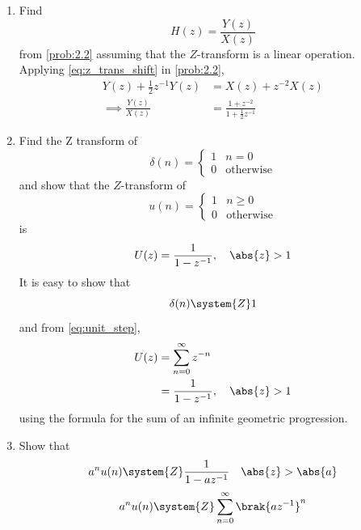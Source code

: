 \documentclass[journal,12pt,twocolumn]{IEEEtran}
\theoremstyle{remark}
\begin{document}
\begin{enumerate}[label=\thesection.\arabic*]
	\item Find
		\begin{equation}
			H(z) = \frac{Y(z)}{X(z)}
		\end{equation}
		from  \eqref{prob:2.2} assuming that the $Z$-transform is a linear operation.
		\\
		\solution  Applying \eqref{eq:z_trans_shift} in \eqref{prob:2.2},
		\begin{align}
			Y(z) + \frac{1}{2}z^{-1}Y(z) &= X(z)+z^{-2}X(z)
			\\
			\implies \frac{Y(z)}{X(z)} &= \frac{1 + z^{-2}}{1 + \frac{1}{2}z^{-1}}
			\label{eq:freq_resp}
		\end{align}
	\item Find the Z transform of 
		\begin{equation}
			\delta(n)
			=
			\begin{cases}
				1 & n = 0
				\\
				0 & \text{otherwise}
			\end{cases}
		\end{equation}
		and show that the $Z$-transform of
		\begin{equation}
			\label{eq:unit_step}
			u(n)
			=
			\begin{cases}
				1 & n \ge 0
				\\
				0 & \text{otherwise}
			\end{cases}
		\end{equation}
		is
		\begin{equation}
			U(z) = \frac{1}{1-z^{-1}}, \quad \abs{z} > 1
		\end{equation}
		\solution It is easy to show that
		\begin{equation}
			\delta(n) \system{Z} 1
		\end{equation}
		and from \eqref{eq:unit_step},
		\begin{align}
			U(z) &= \sum _{n= 0}^{\infty}z^{-n}
			\\
			&=\frac{1}{1-z^{-1}}, \quad \abs{z} > 1
		\end{align}
		using the formula for the sum of an infinite geometric progression.
	\item Show that 
		\begin{equation}
			\label{eq:anun}
			a^nu(n) \system{Z} \frac{1}{1-az^{-1}} \quad \abs{z} > \abs{a}
		\end{equation}
		\solution 
		\begin{align}
				a^nu(n) &\system{Z} \sum_{n = 0}^{\infty}\brak{az^{-1}}^n \\

\end{align}
\end{enumerate}
\end{document}
